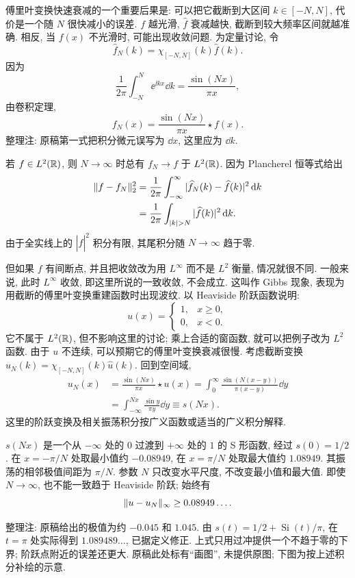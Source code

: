 傅里叶变换快速衰减的一个重要后果是: 可以把它截断到大区间 $k\in[-N,N]$, 代价是一个随 $N$ 很快减小的误差. $f$ 越光滑, $\widehat f$ 衰减越快, 截断到较大频率区间就越准确. 相反, 当 $f(x)$ 不光滑时, 可能出现收敛问题. 为定量讨论, 令
\[
\widehat f_N(k)=\chi_{[-N,N]}(k)\widehat f(k).
\]
因为
\[
\frac1{2\pi}\int_{-N}^{N}\ee^{\ii kx}\dd k=\frac{\sin(Nx)}{\pi x},
\]
由卷积定理,
\[
f_N(x)=\frac{\sin(Nx)}{\pi x}\star f(x).
\]
整理注: 原稿第一式把积分微元误写为 $\dd x$, 这里应为 $\dd k$.

若 $f\in L^2(\mathbb R)$, 则 $N\to\infty$ 时总有 $f_N\to f$ 于 $L^2(\mathbb R)$. 因为 Plancherel 恒等式给出
\begin{align*}
\norm{f-f_N}_2^2
&=\frac1{2\pi}\int_{-\infty}^{\infty}
|\widehat f_N(k)-\widehat f(k)|^2\dd k\\
&=\frac1{2\pi}\int_{|k|>N}|\widehat f(k)|^2\dd k.
\end{align*}
由于全实线上的 $|\widehat f|^2$ 积分有限, 其尾积分随 $N\to\infty$ 趋于零.

但如果 $f$ 有间断点, 并且把收敛改为用 $L^\infty$ 而不是 $L^2$ 衡量, 情况就很不同. 一般来说, 此时 $L^\infty$ 收敛, 即这里所说的一致收敛, 不会成立. 这叫作 Gibbs 现象, 表现为用截断的傅里叶变换重建函数时出现波纹. 以 Heaviside 阶跃函数说明:
\[
u(x)=\begin{cases}1,&x\ge0,\\0,&x<0.\end{cases}
\]
它不属于 $L^2(\mathbb R)$, 但不影响这里的讨论; 乘上合适的窗函数, 就可以把例子改为 $L^2$ 函数. 由于 $u$ 不连续, 可以预期它的傅里叶变换衰减很慢. 考虑截断变换 $\widehat u_N(k)=\chi_{[-N,N]}(k)\widehat u(k)$. 回到空间域,
\begin{align*}
u_N(x)
&=\frac{\sin(Nx)}{\pi x}\star u(x)
=\int_0^{\infty}\frac{\sin(N(x-y))}{\pi(x-y)}\dd y\\
&=\int_{-\infty}^{Nx}\frac{\sin y}{\pi y}\dd y
\equiv s(Nx).
\end{align*}
这里的阶跃变换及相关振荡积分按广义函数或适当的广义积分解释.

$s(Nx)$ 是一个从 $-\infty$ 处的 $0$ 过渡到 $+\infty$ 处的 $1$ 的 S 形函数, 经过 $s(0)=1/2$. 在 $x=-\pi/N$ 处取最小值约 $-0.08949$, 在 $x=\pi/N$ 处取最大值约 $1.08949$. 其振荡的相邻极值间距为 $\pi/N$. 参数 $N$ 只改变水平尺度, 不改变最小值和最大值. 即使 $N\to\infty$, 也不能一致趋于 Heaviside 阶跃; 始终有
\[
\lVert u-u_N\rVert_\infty\ge0.08949\ldots.
\]
\begin{remark}
整理注: 原稿给出的极值为约 $-0.045$ 和 $1.045$. 由 $s(t)=1/2+\operatorname{Si}(t)/\pi$, 在 $t=\pi$ 处实际得到 $1.089489\ldots$, 已据定义修正. 上式只用过冲提供一个不趋于零的下界; 阶跃点附近的误差还更大. 原稿此处标有“画图”, 未提供原图; 下图为按上述积分补绘的示意.
\end{remark}

